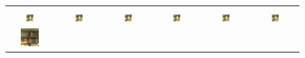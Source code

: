 \begin{figure}[ht!]
{\begin{tabular}{cccccc}
        \vspace{-7pt}
        \\

        \includegraphics[width=0.180\textwidth, height=0.136\textwidth]{img/qual/Bicycle/HR-view.annotated.png} &
        \includegraphics[width=0.180\textwidth, height=0.136\textwidth]{img/qual/Bicycle/IINet/2_2.png} &
        \includegraphics[width=0.180\textwidth, height=0.136\textwidth]{img/qual/Bicycle/DistgSSR/2_2.png} &
        \includegraphics[width=0.180\textwidth, height=0.136\textwidth]{img/qual/Bicycle/LFT/2_2.png} &
        \includegraphics[width=0.180\textwidth, height=0.136\textwidth]{img/qual/Bicycle/EPIT/2_2.png} &
        \includegraphics[width=0.180\textwidth, height=0.136\textwidth]{img/qual/Bicycle/SAT/2_2.png} \\
        \begin{minipage}{0.180\textwidth}
            \centering
            \includegraphics[width=0.46\textwidth, height=0.46\textwidth,cfbox=blue 1pt 0pt]{img/qual/Bicycle/HR.annotated.png}

\end{minipage}
\end{tabular}}
\end{figure}
